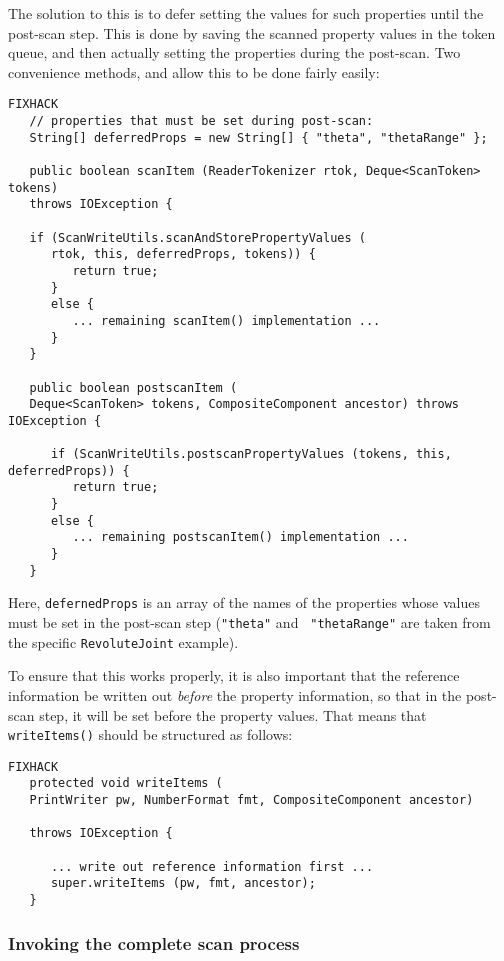 \documentclass{article}
\begin{document}
The solution to this is to defer setting the values for such
properties until the post-scan step. This is done by saving the
scanned property values in the token queue, and then actually setting
the properties during the post-scan. Two convenience methods,
and 
allow this to be done fairly easily:
\begin{lstlisting}FIXHACK
   // properties that must be set during post-scan:
   String[] deferredProps = new String[] { "theta", "thetaRange" };

   public boolean scanItem (ReaderTokenizer rtok, Deque<ScanToken> tokens)
   throws IOException {

   if (ScanWriteUtils.scanAndStorePropertyValues (
      rtok, this, deferredProps, tokens)) {
         return true;
      }
      else {
         ... remaining scanItem() implementation ...
      }
   }

   public boolean postscanItem (
   Deque<ScanToken> tokens, CompositeComponent ancestor) throws IOException {

      if (ScanWriteUtils.postscanPropertyValues (tokens, this, deferredProps)) {
         return true;
      }
      else {
         ... remaining postscanItem() implementation ...
      }
   }
\end{lstlisting}
Here, {\tt defernedProps} is an array of the names of the properties
whose values must be set in the post-scan step ({\tt "theta"} and {\tt
"thetaRange"} are taken from the specific {\tt RevoluteJoint} example).

To ensure that this works properly, it is also important that the
reference information be written out {\it before} the property
information, so that in the post-scan step, it will be set before the
property values.  That means that {\tt writeItems()} should be
structured as follows:
\begin{lstlisting}FIXHACK
   protected void writeItems (
   PrintWriter pw, NumberFormat fmt, CompositeComponent ancestor) 

   throws IOException {

      ... write out reference information first ...
      super.writeItems (pw, fmt, ancestor);
   }
\end{lstlisting}

\subsubsection{Invoking the complete scan process}
\end{document}
